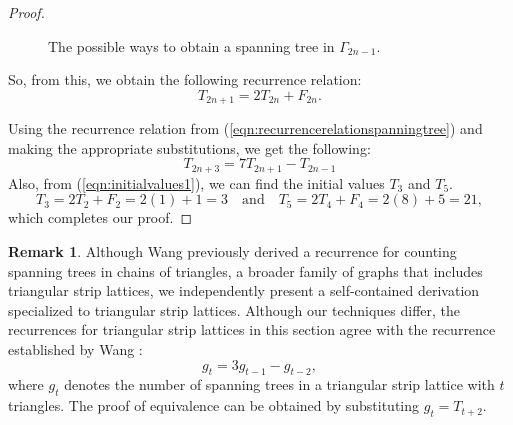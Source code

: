 \documentclass{amsart}
\theoremstyle{definition}
\newtheorem{remark}[theorem]{Remark}
\newcommand{\saugat}[1]{\marginpar{\tiny \color{blue} Saugat: #1}}
\begin{document}
\begin{proof}
\begin{figure}[htbp]
        \caption{The possible ways to obtain a spanning tree in $\Gamma_{2n - 1}$.}
        \label{fig:R_{2n - 1}}
    \end{figure}
    \par
    So, from this, we obtain the following recurrence relation: 
    \[ T_{2n + 1} = 2T_{2n} + F_{2n}.\]
    
    Using the recurrence relation from (\ref{eqn:recurrencerelationspanningtree}) and making the appropriate substitutions, we get the following: 
    \begin{equation} \label{eqn:recurrencerelationspanningtreeodd} 
     T_{2n+3} = 7T_{2n+1} - T_{2n-1}
 \end{equation}
    Also, from (\ref{eqn:initialvalues1}), we can find the initial values $T_3$ and $T_5$.
    \begin{equation}\label{eqn:initialvalues2}
    T_3 = 2T_2 + F_2 = 2(1) + 1 = 3
    \quad \text{and} \quad
    T_5 = 2T_4 + F_4 = 2(8) + 5 = 21,
\end{equation} which completes our proof.
\end{proof}


\begin{remark}
Although Wang \cite{wang2023triangular} previously derived a recurrence for counting spanning trees in chains of triangles, a broader family of graphs that includes triangular strip lattices, we independently present a self-contained derivation specialized to triangular strip lattices. Although our techniques differ, the recurrences for triangular strip lattices in this section agree with the recurrence established by Wang \cite{wang2023triangular}:
\[
g_t = 3g_{t-1}-g_{t-2},
\]
where $g_t$ denotes the number of spanning trees in a triangular strip lattice with $t$ triangles. The proof of equivalence can be obtained by substituting $g_t=T_{t+2}.$
\end{remark}
\end{document}
